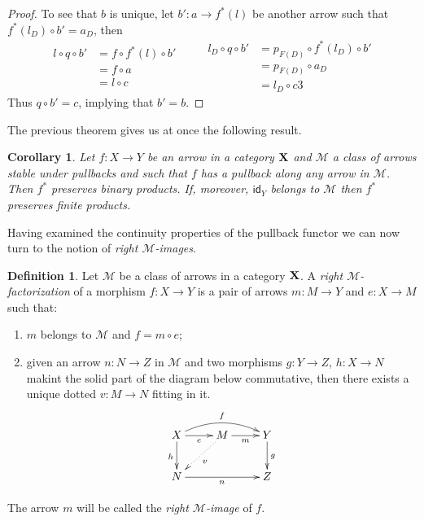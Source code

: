 \documentclass[a4paper]{article}
\newcommand{\id}[1]{\mathsf{id}_{#1}}
\def\X{\textbf {\textup{X}}}
\newtheorem{corollary}[theorem]{Corollary}
\theoremstyle{definition}
\newtheorem{definition}[theorem]{Definition}
\begin{document}
\begin{proof}
	To see that $b$ is unique, let $b'\colon a\to f^*(l)$ be another arrow such that $f^*(l_D)\circ b' =a_D$, then
	\[\begin{split}
		l\circ q \circ b'&=f\circ f^*(l)\circ b'\\&=f\circ a\\&=l\circ c
	\end{split} \qquad \begin{split}
		l_D\circ q \circ b'&=p_{F(D)}\circ f^*(l_D)\circ b'\\&=p_{F(D)}\circ a_D\\&=l_D\circ c
		3\end{split}\]
	Thus $q\circ b'=c$, implying that $b'=b$.
\end{proof}

The previous theorem gives us at once the following result.

\begin{corollary} \label{cor:finlim}
	Let $f\colon X\to Y$ be an arrow in a category $\X$ and $\mathcal{M}$ a class of arrows stable under pullbacks and such that $f$ has a pullback along any arrow in $\mathcal{M}$. Then $f^*$ preserves binary products. If, moreover, $\id{Y}$ belongs to $\mathcal{M}$ then $f^*$ preserves finite products.
\end{corollary}

Having examined the continuity properties of the pullback functor we can now turn to the notion of \emph{right $\mathcal{M}$-images}.

\begin{definition}
	Let $\mathcal{M}$ be a class of arrows in a category $\X$. A \emph{right $\mathcal{M}$-factorization
	} of a morphism $f\colon X\to Y$ is a pair of arrows $m\colon M\to Y$ and $e\colon X\to M$ such that:
	\begin{enumerate}
		\item $m$ belongs to $\mathcal{M}$ and $f=m\circ e$;
		\item given an arrow $n\colon N\to Z$ in $\mathcal{M}$ and two morphisms $g\colon Y\to Z$, $h\colon X\to N$ makint the solid part of the diagram below commutative, then there exists a unique dotted $v\colon M\to N$ fitting in it.
		\[\xymatrix{X \ar[r]_-{e} \ar@/^.4cm/[rr]^{f} \ar[d]_{h}& M \ar[r]_-{m} \ar@{.>}[dl]^{v} & Y \ar[d]^{g}\\N \ar[rr]_{n} && Z}\] 
	\end{enumerate}  
	
	The arrow $m$ will be called the \emph{right $\mathcal{M}$-image} of $f$.
\end{definition}
\end{document}
